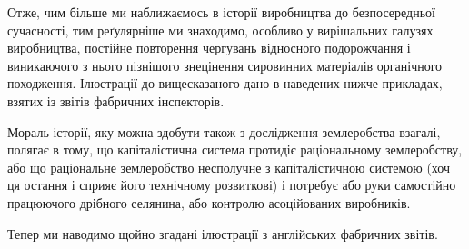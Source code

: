 Отже, чим більше ми наближаємось в історії виробництва
до безпосередньої сучасності, тим реґулярніше ми знаходимо,
особливо у вирішальних галузях виробництва, постійне повторення
чергувань відносного подорожчання і виникаючого з нього
пізнішого знецінення сировинних матеріалів органічного походження.
Ілюстрації до вищесказаного дано в наведених нижче
прикладах, взятих із звітів фабричних інспекторів.

Мораль історії, яку можна здобути також з дослідження землеробства
взагалі, полягає в тому, що капіталістична система
протидіє раціональному землеробству, або що раціональне землеробство
несполучне з капіталістичною системою (хоч ця остання
і сприяє його технічному розвиткові) і потребує або руки самостійно
працюючого дрібного селянина, або контролю асоційованих
виробників.

Тепер ми наводимо щойно згадані ілюстрації з англійських
фабричних звітів.

